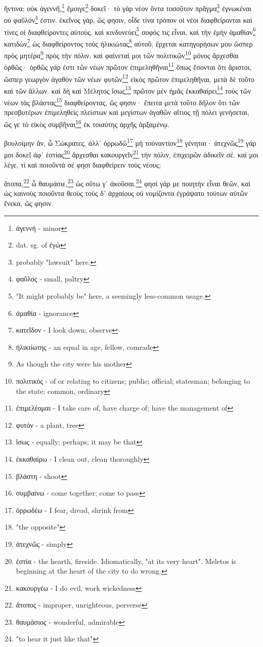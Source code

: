 ἥντινα;
οὐκ
ἀγεννῆ,\footnote{ἀγεννή - minor}
ἔμοιγε\footnote{dat. sg. of ἐγώ}
δοκεῖ·
τὸ
γὰρ
νέον
ὄντα
τοσοῦτον
πρᾶγμα\footnote{probably "lawsuit" here.}
ἐγνωκέναι
οὐ
φαῦλόν\footnote{φαῦλος - small, paltry}
ἐστιν.
ἐκεῖνος
γάρ,
ὥς
φησιν,
οἶδε
τίνα
τρόπον
οἱ
νέοι
διαφθείρονται
καὶ
τίνες
οἱ
διαφθείροντες
αὐτούς.
καὶ
κινδυνεύει\footnote{"It might probably be" here, a seemingly less-common usage.}
σοφός
τις
εἶναι,
καὶ
τὴν
ἐμὴν
ἀμαθίαν\footnote{ἀμαθία - ignorance}
κατιδὼν\footnote{κατεῖδον - I look down; observe}
ὡς
διαφθείροντος
τοὺς
ἡλικιώτας\footnote{ἡλικιίωτης - an equal in age, fellow, comrade}
αὐτοῦ,
ἔρχεται
κατηγορήσων
μου
ὥσπερ
πρὸς
μητέρα\footnote{As though the city were his mother}
πρὸς
τὴν
πόλιν.
καὶ
φαίνεταί
μοι
τῶν
πολιτικῶν\footnote{πολιτικός - of or relating to citizens; public; official; statesman; belonging to the state; common, ordinary}
\versification{[2d]}
μόνος
ἄρχεσθαι
ὀρθῶς·
ὀρθῶς
γάρ
ἐστι
τῶν
νέων
πρῶτον
ἐπιμεληθῆναι\footnote{ἐπιμελέομαι - I take care of, have charge of; have the management of}
ὅπως
ἔσονται
ὅτι
ἄριστοι,
ὥσπερ
γεωργὸν
ἀγαθὸν
τῶν
νέων
φυτῶν\footnote{φυτόν - a plant, tree}
εἰκὸς
πρῶτον
ἐπιμεληθῆναι,
μετὰ
δὲ
τοῦτο
καὶ
τῶν
ἄλλων.
καὶ
δὴ
καὶ
Μέλητος
ἴσως\footnote{ἴσως - equally; perhaps; it may be that}
πρῶτον
\versification{[3a]}
μὲν
ἡμᾶς
ἐκκαθαίρει\footnote{ἐκκαθαίρω - I clean out, clean thoroughly}
τοὺς
τῶν
νέων
τὰς
βλάστας\footnote{βλάστη - shoot}
διαφθείροντας,
ὥς
φησιν·
ἔπειτα
μετὰ
τοῦτο
δῆλον
ὅτι
τῶν
πρεσβυτέρων
ἐπιμεληθεὶς
πλείστων
καὶ
μεγίστων
ἀγαθῶν
αἴτιος
τῇ
πόλει
γενήσεται,
ὥς
γε
τὸ
εἰκὸς
συμβῆναι\footnote{συμβαίνω - come together; come to pass}
ἐκ
τοιαύτης
ἀρχῆς
ἀρξαμένῳ. 







βουλοίμην
ἄν,
ὦ
Σώκρατες,
ἀλλ᾽
ὀρρωδῶ\footnote{ὀρρωδέω - I fear, dread, shrink from}
μὴ
τοὐναντίον\footnote{"the opposite"}
γένηται·
ἀτεχνῶς\footnote{ἀτεχνῶς - simply}
γάρ
μοι
δοκεῖ
ἀφ᾽
ἑστίας\footnote{ἑστία - the hearth, fireside. Idiomatically, "at its very heart". Meletos is beginning at the heart of the city to do wrong.}
ἄρχεσθαι
κακουργεῖν\footnote{κακουργέω - I do evil, work wickedness}
τὴν
πόλιν,
ἐπιχειρῶν
ἀδικεῖν
σέ.
καί
μοι
λέγε,
τί
καὶ
ποιοῦντά
σέ
φησι
διαφθείρειν
τοὺς
νέους; 

\versification{[3b]}
ἄτοπα,\footnote{ἄτοπος - improper, unrighteous, perverse}
ὦ
θαυμάσιε,\footnote{θαυμάσιος - wonderful, admirable}
ὡς
οὕτω
γ᾽
ἀκοῦσαι.\footnote{"to hear it just like that"}
φησὶ
γάρ
με
ποιητὴν
εἶναι
θεῶν,
καὶ
ὡς
καινοὺς
ποιοῦντα
θεοὺς
τοὺς
δ᾽
ἀρχαίους
οὐ
νομίζοντα
ἐγράψατο
τούτων
αὐτῶν
ἕνεκα,
ὥς
φησιν.

